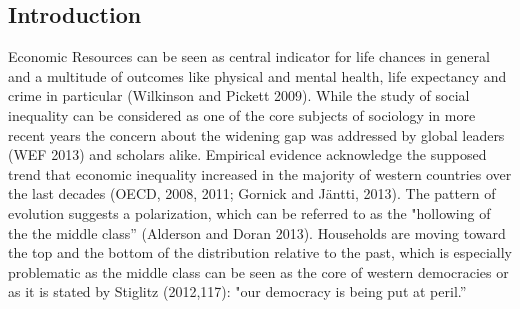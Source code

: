 \documentclass[twoside]{article}
\begin{document}
\begin{multicols}{2} %




\section{Introduction}





Economic Resources can be seen as central indicator for life chances in general and a multitude of outcomes like physical and mental health, life expectancy and crime in particular (Wilkinson and Pickett 2009). While the study of social inequality can be considered as one of the core subjects of sociology in more recent years the concern about the widening gap was addressed by global leaders (WEF 2013) and scholars alike. Empirical evidence acknowledge the supposed trend that economic inequality increased in the majority of western countries over the last decades (OECD, 2008, 2011; Gornick and Jäntti, 2013). The pattern of evolution suggests a polarization, which can be referred to as the "hollowing of the the middle class'' (Alderson and Doran 2013). Households are moving toward the top and the bottom of the distribution relative to the past, which is especially problematic as the middle class can be seen as the core of western democracies or as it is stated by Stiglitz (2012,117): "our democracy is being put at peril.''
\\





\end{multicols}
\end{document}
